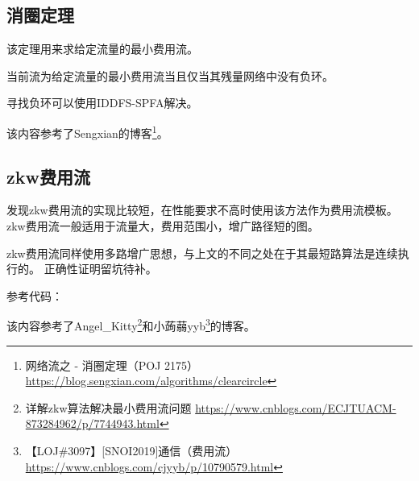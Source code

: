 \subsection{消圈定理}
该定理用来求给定流量的最小费用流。

\begin{theorem}[消圈定理]
	当前流为给定流量的最小费用流当且仅当其残量网络中没有负环。
\end{theorem}

寻找负环可以使用IDDFS-SPFA解决。

该内容参考了Sengxian的博客\footnote{
	网络流之 - 消圈定理（POJ 2175）\\
	\url{https://blog.sengxian.com/algorithms/clearcircle}
}。
\subsection{zkw费用流}
发现zkw费用流的实现比较短，在性能要求不高时使用该方法作为费用流模板。
zkw费用流一般适用于流量大，费用范围小，增广路径短的图。

zkw费用流同样使用多路增广思想，与上文的不同之处在于其最短路算法是连续执行的。
正确性证明留坑待补。

参考代码：


该内容参考了Angel\_Kitty\footnote{
    详解zkw算法解决最小费用流问题
    \url{https://www.cnblogs.com/ECJTUACM-873284962/p/7744943.html}
}和小蒟蒻yyb\footnote{
    【LOJ\#3097】[SNOI2019]通信（费用流）
    \url{https://www.cnblogs.com/cjyyb/p/10790579.html}
}的博客。
